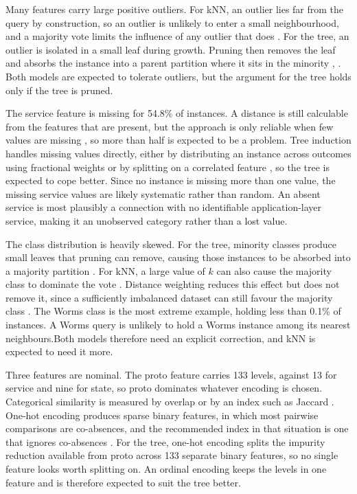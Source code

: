 \documentclass[conference]{IEEEtran}
\begin{document}
Many features carry large positive outliers. For kNN, an outlier lies far from
the query by construction, so an outlier is unlikely to enter a small
neighbourhood, and a majority vote limits the influence of any outlier that does
\cite{topic3}. For the tree, an outlier is isolated in a small leaf during
growth. Pruning then removes the leaf and absorbs the instance into a parent
partition where it sits in the minority \cite{topic4}, \cite{kelleher2015}. Both
models are expected to tolerate outliers, but the argument for the tree holds
only if the tree is pruned.

The service feature is missing for 54.8\% of instances. A distance is still
calculable from the features that are present, but the approach is only
reliable when few values are missing \cite{topic3}, so more than half is
expected to be a problem. Tree induction handles missing values directly,
either by distributing an instance across outcomes using fractional weights
\cite{topic4} or by splitting on a correlated feature \cite{wang1997}, so the
tree is expected to cope better. Since no instance is missing more than one
value, the missing service values are likely systematic rather than random. An
absent service is most plausibly a connection with no identifiable
application-layer service, making it an unobserved category rather than a lost
value.

The class distribution is heavily skewed. For the tree, minority classes produce 
small leaves that pruning can remove, causing those instances to be absorbed into 
a majority partition \cite{topic4}. For kNN, a large value of $k$ can also cause 
the majority class to dominate the vote \cite{kelleher2015}. Distance weighting 
reduces this effect but does not remove it, since a sufficiently imbalanced dataset 
can still favour the majority class \cite{kelleher2015}. The Worms class is the most extreme example, holding less than 0.1\% of
instances. A Worms query is unlikely to hold a Worms instance among its nearest
neighbours.Both models therefore need an explicit correction, and kNN is
expected to need it more.

Three features are nominal. The proto feature carries 133 levels, against 13
for service and nine for state, so proto dominates whatever encoding is chosen.
Categorical similarity is measured by overlap or by an index such as Jaccard
\cite{topic3,kelleher2015}. One-hot encoding produces sparse binary
features, in which most pairwise comparisons are co-absences, and the recommended
index in that situation is one that ignores co-absences \cite{kelleher2015}. For
the tree, one-hot encoding splits the impurity reduction available from proto
across 133 separate binary features, so no single feature looks worth splitting
on. An ordinal encoding keeps the levels in one feature and is therefore expected
to suit the tree better.
\end{document}

